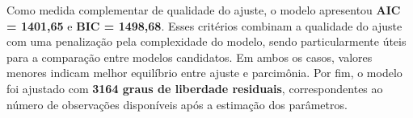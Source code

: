 \documentclass[
  brazilian,
  12pt,
  letterpaper,
  DIV=11,
  numbers=noendperiod]{scrartcl}
\begin{document}
Como medida complementar de qualidade do ajuste, o modelo apresentou
\textbf{AIC = 1401,65} e \textbf{BIC = 1498,68}. Esses critérios
combinam a qualidade do ajuste com uma penalização pela complexidade do
modelo, sendo particularmente úteis para a comparação entre modelos
candidatos. Em ambos os casos, valores menores indicam melhor equilíbrio
entre ajuste e parcimônia. Por fim, o modelo foi ajustado com
\textbf{3164 graus de liberdade residuais}, correspondentes ao número de
observações disponíveis após a estimação dos parâmetros.

{

\begin{longtable}[]{@{}
  >{\raggedright\arraybackslash}p{}
  >{\raggedleft\arraybackslash}p{}
  >{\raggedleft\arraybackslash}p{}
  >{\raggedleft\arraybackslash}p{}
  >{\raggedleft\arraybackslash}p{}
  >{\raggedleft\arraybackslash}p{}@{}}

\caption{\label{tbl-complete-model-default}}

\tabularnewline


\end{longtable}}
\end{document}
